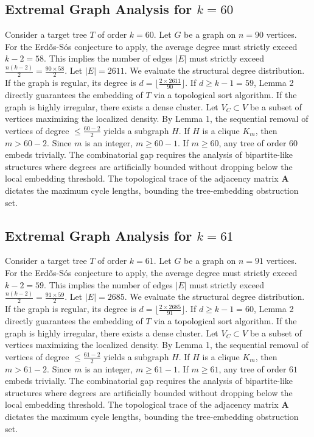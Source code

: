 \documentclass[11pt,a4paper]{article}
\begin{document}
\subsection{Extremal Graph Analysis for $k=60$}
Consider a target tree $T$ of order $k=60$.
Let $G$ be a graph on $n=90$ vertices.
For the Erd\H{o}s-S\'os conjecture to apply, the average degree must strictly exceed $k-2 = 58$.
This implies the number of edges $|E|$ must strictly exceed $\frac{n(k-2)}{2} = \frac{90 \times 58}{2}$.
Let $|E| = 2611$.
We evaluate the structural degree distribution. If the graph is regular, its degree is $d = \lfloor \frac{2 \times 2611}{90} \rfloor$.
If $d \geq k-1 = 59$, Lemma 2 directly guarantees the embedding of $T$ via a topological sort algorithm.
If the graph is highly irregular, there exists a dense cluster. Let $V_C \subset V$ be a subset of vertices maximizing the localized density.
By Lemma 1, the sequential removal of vertices of degree $\leq \frac{60-2}{2}$ yields a subgraph $H$.
If $H$ is a clique $K_{m}$, then $m > 60-2$. Since $m$ is an integer, $m \geq 60-1$. If $m \geq 60$, any tree of order $60$ embeds trivially.
The combinatorial gap requires the analysis of bipartite-like structures where degrees are artificially bounded without dropping below the local embedding threshold. The topological trace of the adjacency matrix $\mathbf{A}$ dictates the maximum cycle lengths, bounding the tree-embedding obstruction set.


\subsection{Extremal Graph Analysis for $k=61$}
Consider a target tree $T$ of order $k=61$.
Let $G$ be a graph on $n=91$ vertices.
For the Erd\H{o}s-S\'os conjecture to apply, the average degree must strictly exceed $k-2 = 59$.
This implies the number of edges $|E|$ must strictly exceed $\frac{n(k-2)}{2} = \frac{91 \times 59}{2}$.
Let $|E| = 2685$.
We evaluate the structural degree distribution. If the graph is regular, its degree is $d = \lfloor \frac{2 \times 2685}{91} \rfloor$.
If $d \geq k-1 = 60$, Lemma 2 directly guarantees the embedding of $T$ via a topological sort algorithm.
If the graph is highly irregular, there exists a dense cluster. Let $V_C \subset V$ be a subset of vertices maximizing the localized density.
By Lemma 1, the sequential removal of vertices of degree $\leq \frac{61-2}{2}$ yields a subgraph $H$.
If $H$ is a clique $K_{m}$, then $m > 61-2$. Since $m$ is an integer, $m \geq 61-1$. If $m \geq 61$, any tree of order $61$ embeds trivially.
The combinatorial gap requires the analysis of bipartite-like structures where degrees are artificially bounded without dropping below the local embedding threshold. The topological trace of the adjacency matrix $\mathbf{A}$ dictates the maximum cycle lengths, bounding the tree-embedding obstruction set.
\end{document}
